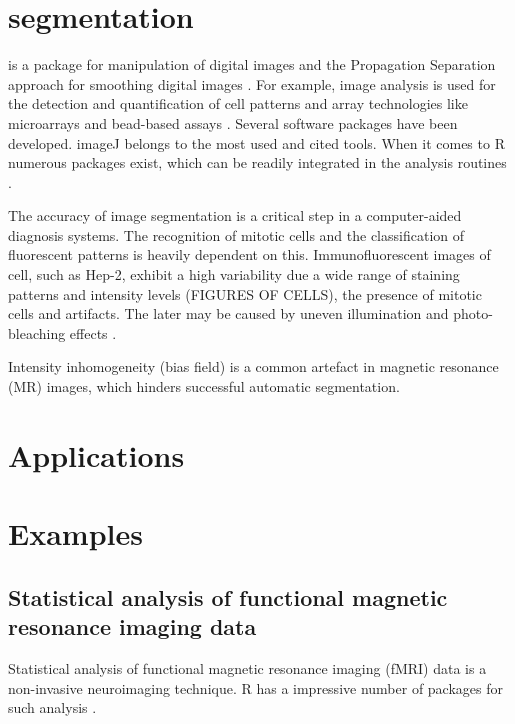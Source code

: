 \section{segmentation}

\citep{holmes_interactive_2009}

 is a package for manipulation of digital images and the 
Propagation Separation approach for smoothing digital images \citep{polzehl_adaptive_2007}.
For example, image analysis is used for the detection and quantification of 
cell patterns and array technologies like microarrays and bead-based assays 
\citep{dunning_beadarray:_2006, rodiger_highly_2013, willitzki_new_2012, willitzki_fully_2013}.
Several software packages have been developed. imageJ belongs to the most 
used and cited tools. When it comes to R numerous packages exist, which can 
be readily integrated in the analysis routines \citep{schultze_illuminagui_2007, frery_introduction_2013}.

The accuracy of image segmentation is a critical step in a computer-aided 
diagnosis systems. The recognition of mitotic cells and the classification of 
fluorescent patterns is heavily dependent on this. Immunofluorescent images 
of cell, such as Hep-2, exhibit a high variability due a wide range of staining 
patterns and intensity levels (FIGURES OF CELLS), the presence of mitotic 
cells and  artifacts. The later may be caused by uneven illumination and 
photo-bleaching effects \citep{tonti_automated_2015}.

Intensity inhomogeneity (bias field) is a common artefact in magnetic resonance 
(MR) images, which hinders successful automatic segmentation. \citep{ivanovska_efficient_2016}

\section{Applications}

\section{Examples}
\subsection{Statistical analysis of functional magnetic resonance imaging data}

Statistical analysis of functional magnetic resonance imaging (fMRI) data  is a 
non-invasive neuroimaging technique. R has a impressive number of packages for 
such analysis \citep{tabelow_special_2011}.

